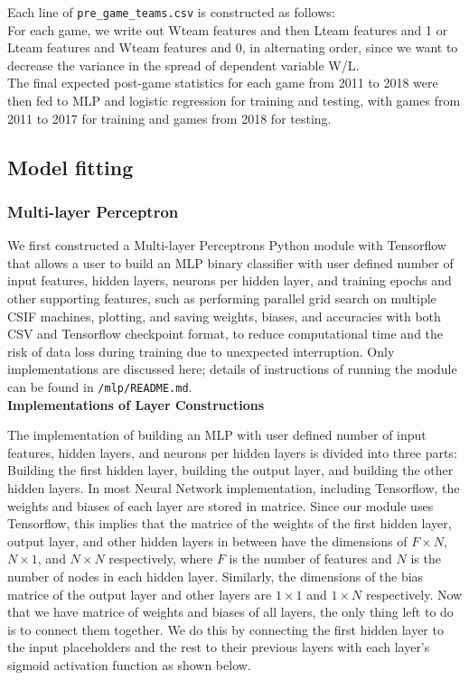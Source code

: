 \documentclass[12pt]{article}
\begin{document}
\quad Each line of \texttt{pre\_game\_teams.csv} is constructed as follows:\\

\quad For each game, we write out Wteam features and then Lteam features and 1 or Lteam features and Wteam features and 0, in alternating order, since we want to decrease the variance in the spread of dependent variable W/L. \\

\quad The final expected post-game statistics for each game from 2011 to 2018 were then fed to MLP and logistic regression for training and testing, with games from 2011 to 2017 for training and games from 2018 for testing. 

\subsection{Model fitting}

\subsubsection{Multi-layer Perceptron}

\quad We first constructed a Multi-layer Perceptrons Python module with Tensorflow that allows a user to build an MLP binary classifier with user defined number of input features, hidden layers, neurons per hidden layer, and training epochs and other supporting features, such as performing parallel grid search on multiple CSIF machines,  plotting,  and saving weights, biases, and accuracies with both CSV and Tensorflow checkpoint format, to reduce computational time and the risk of data loss during training due to unexpected interruption. Only implementations are discussed here; details of instructions of running the module can be found in \texttt{/mlp/README.md}. \\

\textbf{Implementations of Layer Constructions}

\quad The implementation of building an MLP with user defined number of input features, hidden layers, and neurons per hidden layers is divided into three parts: Building the first hidden layer, building the output layer, and building the other hidden layers. In most Neural Network implementation, including Tensorflow, the weights and biases of each layer are stored in matrice. Since our module uses Tensorflow, this implies that the matrice of the weights of the first hidden layer, output layer, and other hidden layers in between have the dimensions of $F \times N$, $N \times 1$, and $N \times N$ respectively, where $F$ is the number of features and $N$ is the number of nodes in each hidden layer. Similarly, the dimensions of the bias matrice of the output layer and other layers are $1 \times 1$ and $1 \times N$ respectively.  Now that we have matrice of weights and biases of all layers, the only thing left to do is to connect them together. We do this by connecting the first hidden layer to the input placeholders and the rest to their previous layers with each layer's sigmoid activation function as shown below.  
\end{document}
